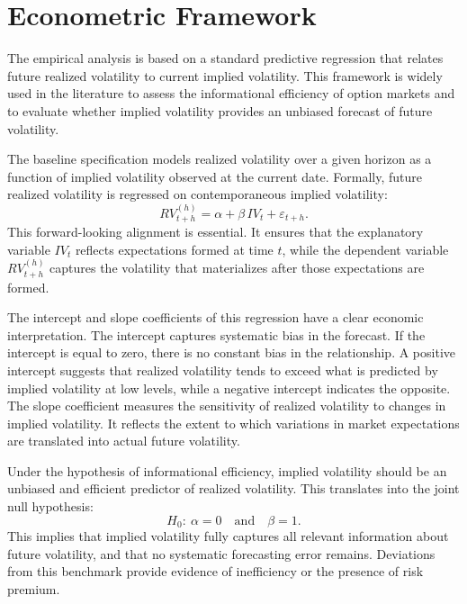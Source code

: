 \documentclass[11pt,a4paper,openany]{report}
\begin{document}
\section{Econometric Framework}\label{econometric-framework}

The empirical analysis is based on a standard predictive regression that
relates future realized volatility to current implied volatility. This
framework is widely used in the literature to assess the informational
efficiency of option markets and to evaluate whether implied volatility
provides an unbiased forecast of future volatility.

The baseline specification models realized volatility over a given
horizon as a function of implied volatility observed at the current
date. Formally, future realized volatility is regressed on
contemporaneous implied volatility:
\begin{equation}
RV_{t+h}^{(h)} = \alpha + \beta\, IV_t + \varepsilon_{t+h}.
\label{eq:reg}
\end{equation}
This forward-looking alignment is essential. It ensures that the
explanatory variable $IV_t$ reflects expectations formed at time $t$,
while the dependent variable $RV_{t+h}^{(h)}$ captures the volatility
that materializes after those expectations are formed.

The intercept and slope coefficients of this regression have a clear
economic interpretation. The intercept captures systematic bias in the
forecast. If the intercept is equal to zero, there is no constant bias
in the relationship. A positive intercept suggests that realized
volatility tends to exceed what is predicted by implied volatility at
low levels, while a negative intercept indicates the opposite. The slope
coefficient measures the sensitivity of realized volatility to changes
in implied volatility. It reflects the extent to which variations in
market expectations are translated into actual future volatility.

Under the hypothesis of informational efficiency, implied volatility
should be an unbiased and efficient predictor of realized volatility.
This translates into the joint null hypothesis:
\begin{equation}
H_0:\ \alpha = 0 \quad \text{and} \quad \beta = 1.
\label{eq:eff}
\end{equation}
This implies that implied volatility fully captures all relevant
information about future volatility, and that no systematic forecasting
error remains. Deviations from this benchmark provide evidence of
inefficiency or the presence of risk premium.
\end{document}
